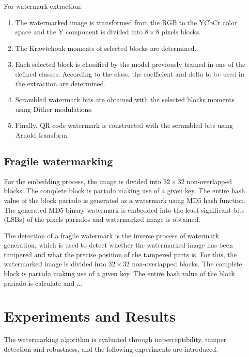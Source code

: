 \documentclass[runningheads]{llncs}
\begin{document}
For watermark extraction:
\begin{enumerate}
	\item The watermarked image is transformed from the RGB to the YCbCr color space and the Y component is divided into $8\times 8$ pixels blocks.
	\item The Krawtchouk moments of selected blocks are determined.
	\item Each selected block is classified by the model previously trained in one of the defined classes. According to the class, the coefficient and delta to be used in the extraction are determined.
	\item Scrambled watermark bits are obtained with the selected blocks moments using Dither modulations.
	\item Finally, QR code watermark is constructed with the scrambled bits using Arnold transform.
\end{enumerate}

\subsection{Fragile watermarking}
For the embedding process, the image is divided into $32\times 32$ non-overlapped blocks. The complete block is pariado making use of a given key. The entire hash value of the block pariado is generated as a watermark using MD5 hash function. The generated MD5 binary watermark is embedded into the least significant bits (LSBs) of the pixels pariados and watermarked image is obtained.

The detection of a fragile watermark is the inverse process of watermark generation, which is used to detect whether the watermarked image has been tampered and what the precise position of the tampered parts is. For this, the watermarked image is divided into $32\times 32$ non-overlapped blocks. The complete block is pariado making use of a given key. The entire hash value of the block pariado is calculate and ...

\section{Experiments and Results}
The watermarking algorithm is evaluated through imperceptibility, tamper detection and robustness, and the following experiments are introduced.
 
\end{document}
